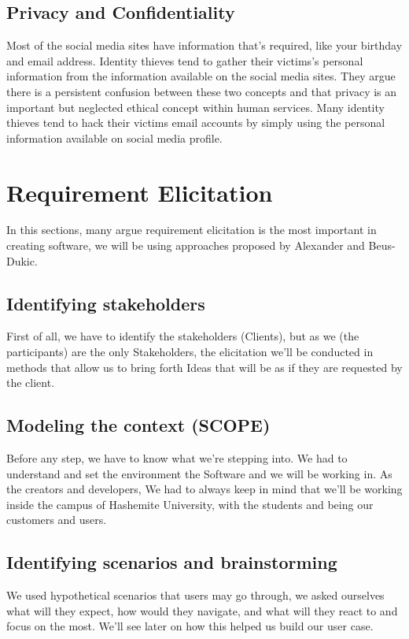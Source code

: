 \documentclass[12pt]{article}
\begin{document}
\subsection{Privacy and Confidentiality}
Most of the social media sites have information that's required, like your birthday and email address. Identity thieves tend to gather their victims’s personal information from the information available on the social media sites. They argue there is a persistent confusion between these two concepts and that privacy is an important but neglected ethical concept within human services. Many identity thieves tend to hack their victims email accounts by simply using the personal information available on social media profile.\cite{Confidentiality}


\section{Requirement Elicitation}
In this sections, many argue requirement elicitation is the most important in creating software, we will be using approaches proposed by Alexander and Beus-Dukic.

\subsection{Identifying stakeholders} 
First of all, we have to identify the stakeholders (Clients), but as we (the participants) are the only Stakeholders, the elicitation we'll be conducted in methods that allow us to bring forth Ideas that will be as if they are requested by the client.
\subsection{Modeling the context (SCOPE)}
Before any step, we have to know what we're stepping into.
We had to understand and set the environment the Software and we will be working in. As the creators and developers, 
We had to always keep in mind that we'll be working inside the campus of Hashemite University, with the students and being our customers and users.
\subsection{Identifying scenarios and brainstorming}
We used hypothetical scenarios that users may go through, we asked ourselves what will they expect, how would they navigate, and what will they react to and focus on the most.
We'll see later on how this helped us build our user case.
\end{document}
